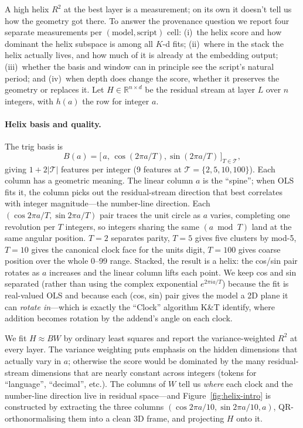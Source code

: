 \documentclass[10pt,letterpaper]{article}
\begin{document}
A high helix $R^2$ at the best layer is a measurement; on its own it
doesn't tell us how the geometry got there. To answer the provenance
question we report four separate measurements per
$(\text{model}, \text{script})$ cell: (i)~the helix score and how
dominant the helix subspace is among all $K$-d fits; (ii)~where in
the stack the helix actually lives, and how much of it is already at
the embedding output; (iii)~whether the basis and window can in
principle see the script's natural period; and (iv)~when depth does
change the score, whether it preserves the geometry or replaces it.
Let $H \in \mathbb{R}^{n \times d}$ be the residual stream at layer
$L$ over $n$ integers, with $h(a)$ the row for integer $a$.

\paragraph{Helix basis and quality.} The trig basis is
\begin{equation}
\label{eq:basis}
B(a) = \big[\,a,\, \cos(2\pi a/T), \sin(2\pi a/T)\,\big]_{T \in \mathcal{T}},
\end{equation}
giving $1 + 2|\mathcal{T}|$ features per integer (9 features at
$\mathcal{T} = \{2,5,10,100\}$). Each column has a geometric meaning.
The linear column $a$ is the ``spine''; when OLS fits it, the column
picks out the residual-stream direction that best correlates with
integer magnitude---the number-line direction. Each
$(\cos 2\pi a/T, \sin 2\pi a/T)$ pair traces the unit circle as $a$
varies, completing one revolution per $T$ integers, so integers
sharing the same $(a \bmod T)$ land at the same angular position.
$T=2$ separates parity, $T=5$ gives five clusters by mod-5, $T=10$
gives the canonical clock face for the units digit, $T=100$ gives
coarse position over the whole 0--99 range. Stacked, the result is
a helix: the cos/sin pair rotates as $a$ increases and the linear
column lifts each point. We keep cos and sin separated (rather than
using the complex exponential $e^{2\pi i a/T}$) because the fit is
real-valued OLS and because each (cos, sin) pair gives the model a
2D plane it can \emph{rotate in}---which is exactly the ``Clock''
algorithm K\&T identify, where addition becomes rotation by the
addend's angle on each clock.

We fit $H \approx B W$ by ordinary least squares and report the
variance-weighted $R^2$ at every layer. The variance weighting puts
emphasis on the hidden dimensions that actually vary in $a$;
otherwise the score would be dominated by the many residual-stream
dimensions that are nearly constant across integers (tokens for
``language'', ``decimal'', etc.). The columns of $W$ tell us
\emph{where} each clock and the number-line direction live in
residual space---and Figure~\ref{fig:helix-intro} is constructed by
extracting the three columns
$(\cos 2\pi a/10, \sin 2\pi a/10, a)$, QR-orthonormalising them into
a clean 3D frame, and projecting $H$ onto it.
\end{document}
